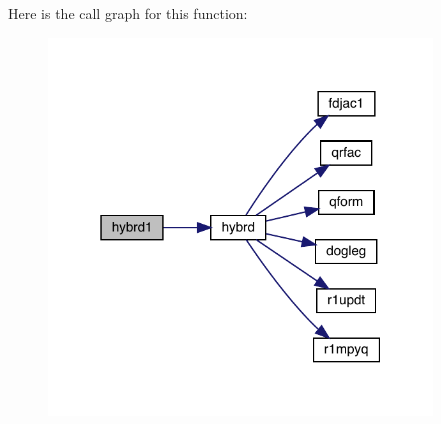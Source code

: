 Here is the call graph for this function\+:\nopagebreak
\begin{figure}[H]
\begin{center}
\leavevmode
\includegraphics[width=289pt]{minpack_8f95_a314aebdd90b16a874c0879d291a2190d_cgraph}
\end{center}
\end{figure}
\mbox{\label{minpack_8f95_a53ab26dfa98e1e91ba7a8c3e5f83ad13}} 
